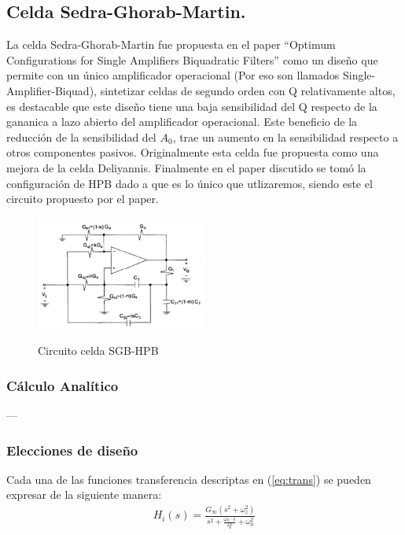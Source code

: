 \subsection{Celda Sedra-Ghorab-Martin.}
La celda Sedra-Ghorab-Martin fue propuesta en el paper ``Optimum Configurations for Single Amplifiers Biquadratic Filters'' como un diseño que permite con un único amplificador operacional (Por eso son llamados Single-Amplifier-Biquad), sintetizar celdas de segundo orden con Q relativamente altos, es destacable que este diseño tiene una baja sensibilidad del Q respecto de la gananica a lazo abierto del amplificador operacional. Este beneficio de la reducción de la sensibilidad del $A_0$, trae un aumento en la sensibilidad respecto a otros componentes pasivos. Originalmente esta celda fue propuesta como una mejora de la celda Deliyannis.
Finalmente en el paper discutido se tomó la configuración de HPB dado a que es lo único que utlizaremos, siendo este el circuito propuesto por el paper.
\begin{figure}[H]
	\centering
	\includegraphics[width=0.5\textwidth]{Imagenes-Ej3/HPBSedra.PNG}
	\label{fig:HPBSedra}
	\caption{Circuito celda SGB-HPB}
\end{figure}
\subsubsection{Cálculo Analítico}
---

\subsubsection{Elecciones de diseño}
Cada una de las funciones transferencia descriptas en (\ref{eq:trans})
 se pueden expresar de la siguiente manera:
\begin{align}
	H_i(s)=\frac{G_\infty (s^2+\omega_z^2)}{s^2+\frac{\omega_0 \cdot s}{Q}+\omega_0^2}
\end{align} 

